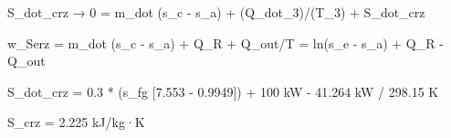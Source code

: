 S_dot_crz → 0 = m_dot (s_c - s_a) + (Q_dot_3)/(T_3) + S_dot_crz

w_Serz = m_dot (s_c - s_a) + Q_R + Q_out/T = ln(s_e - s_a) + Q_R - Q_out

S_dot_crz = 0.3 * (s_fg [7.553 - 0.9949]) + 100 kW - 41.264 kW / 298.15 K

S_crz = 2.225 kJ/kg·K